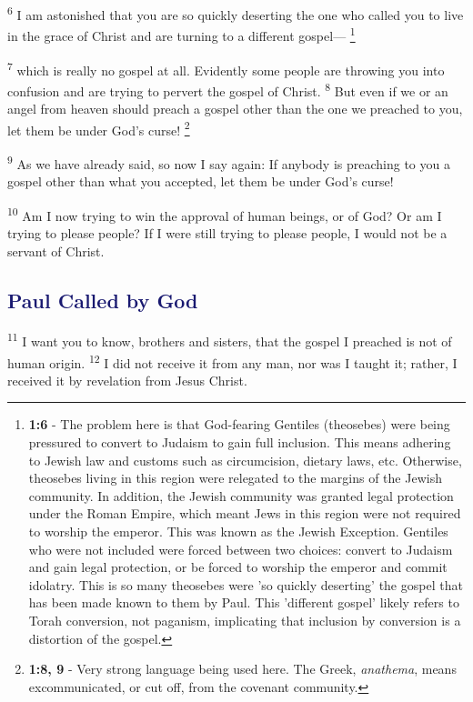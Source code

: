 \documentclass[12pt,twoside]{article}
\newcommand{\vs}[1]{\textsuperscript{#1}}
\newcommand{\vnote}[2]{%
  \begingroup
  \renewcommand\thefootnote{}%
  \footnote{\scriptsize \textbf{}#2}%
  \addtocounter{footnote}{-1}%
  \endgroup
}
\begin{document}
\hspace{0.5cm} \vs{6} I am astonished that you are so quickly deserting the one who called you to live in the grace of Christ and are turning to a different gospel---\vnote{6}{\textbf{1:6} - The problem here is that God-fearing Gentiles (theosebes) were being pressured to convert to Judaism to gain full inclusion. This means adhering to Jewish law and customs such as circumcision, dietary laws, etc. Otherwise, theosebes living in this region were relegated to the margins of the Jewish community. In addition, the Jewish community was granted legal protection under the Roman Empire, which meant Jews in this region were not required to worship the emperor. This was known as the Jewish Exception. Gentiles who were not included were forced between two choices: convert to Judaism and gain legal protection, or be forced to worship the emperor and commit idolatry. This is so many theosebes were 'so quickly deserting' the gospel that has been made known to them by Paul. This 'different gospel' likely refers to Torah conversion, not paganism, implicating that inclusion by conversion is a distortion of the gospel.}
\vs{7} which is really no gospel at all. Evidently some people are throwing you into confusion and are trying to pervert the gospel of Christ.
\vs{8} But even if we or an angel from heaven should preach a gospel other than the one we preached to you, let them be under God's curse!\vnote{8}{\textbf{1:8, 9} - Very strong language being used here. The Greek, \textit{anathema}, means excommunicated, or cut off, from the covenant community.}
\vs{9} As we have already said, so now I say again: If anybody is preaching to you a gospel other than what you accepted, let them be under God's curse!

\vs{10} Am I now trying to win the approval of human beings, or of God? Or am I trying to please people? If I were still trying to please people, I would not be a servant of Christ.

\subsection*{\textcolor{MidnightBlue}{\textbf{Paul Called by God}}}

\hspace{0.5cm} \vs{11} I want you to know, brothers and sisters, that the gospel I preached is not of human origin.
\vs{12} I did not receive it from any man, nor was I taught it; rather, I received it by revelation from Jesus Christ.
\end{document}
